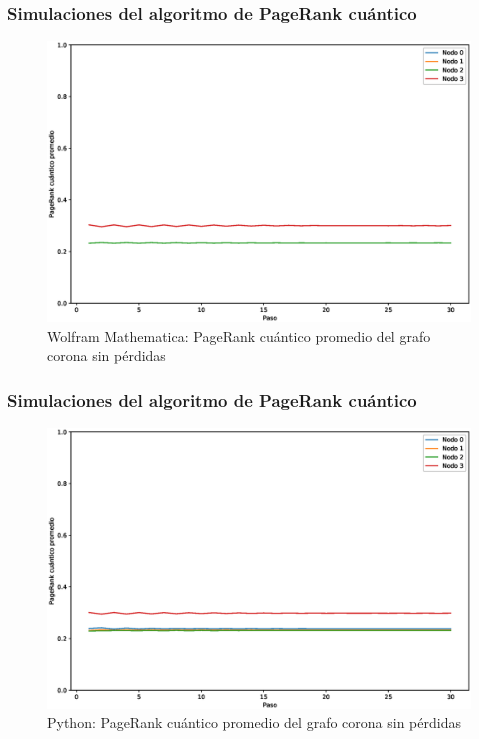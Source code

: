 \documentclass[xetex,mathserif,serif, 8pt]{beamer}
\begin{document}
\begin{frame}
    \frametitle{Simulaciones del algoritmo de PageRank cuántico}

    \begin{figure}[H]
        \centering
        \includegraphics[width=0.9\linewidth]{img/crown-mean-M.eps}
        \caption{Wolfram Mathematica: PageRank cuántico promedio del grafo corona sin pérdidas}
    \end{figure}

\end{frame}

\begin{frame}
    \frametitle{Simulaciones del algoritmo de PageRank cuántico}

    \begin{figure}[H]
        \centering
        \includegraphics[width=0.9\linewidth]{img/crown-mean-lossless.eps}
        \caption{Python: PageRank cuántico promedio del grafo corona sin pérdidas}
    \end{figure}

\end{frame}
\end{document}
